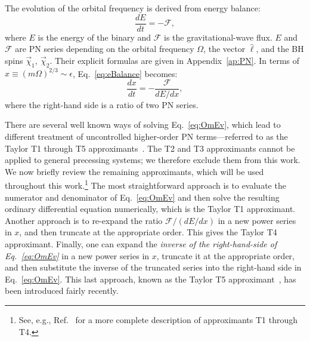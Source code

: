 \documentclass[aps,prd,amsmath,floatfix,twocolumn,superscriptaddress,nofootinbib,showpacs]{revtex4-1}
\newcommand{\ellHat}{\ensuremath{\hat{\ell}}}
\begin{document}
The evolution of the orbital frequency is derived from energy balance:
\begin{equation}
  \label{eq:eBalance}
  \frac{dE}{dt} = -\mathcal{F},
\end{equation}
where $E$ is the energy of the binary and $\mathcal{F}$ is the
gravitational-wave flux. $E$ and $\mathcal{F}$ are PN series depending
on the orbital frequency $\Omega$, the vector $\ellHat$, and the BH
spins $\vec{\chi}_{1},\ \vec{\chi}_{2}$. Their explicit formulas are
given in Appendix~\ref{ap:PN}. In terms of
  $x\equiv(m\Omega)^{2/3} \sim \epsilon$, Eq.~\eqref{eq:eBalance}
becomes:
\begin{equation}
  \label{eq:OmEv}
  \frac{dx}{dt} = -\frac{\mathcal{F}}{dE/dx},
\end{equation}
where the right-hand side is a ratio of two PN series.%

There are several well known ways of solving Eq.~\eqref{eq:OmEv},
which lead to different treatment of uncontrolled higher-order PN
terms---referred to as the Taylor T1 through T5
approximants~\cite{Damour:2000zb,Ajith:2011ec}.  The T2 and T3
approximants cannot be applied to general precessing systems; we
therefore exclude them from this work.  We now briefly review the
remaining approximants, which will be used throughout this
work.\footnote{See, e.g., Ref.~\cite{Boyle2007} for a more complete
  description of approximants T1 through T4.}  The most
straightforward approach is to evaluate the numerator and denominator
of Eq.~\eqref{eq:OmEv} and then solve the resulting ordinary
differential equation numerically, which is the Taylor T1
approximant. Another approach is to re-expand the ratio
$\mathcal{F}/(dE/dx)$ in a new power series in $x$, and then truncate at the
appropriate order. This gives the Taylor T4 approximant. Finally, one
can expand the \emph{inverse of the right-hand-side of
  Eq.~\eqref{eq:OmEv}} in a new power series in $x$, truncate it at the
appropriate order, and then substitute the inverse of the truncated
series into the right-hand side in Eq.~\eqref{eq:OmEv}.  This last
approach, known as the Taylor T5 approximant~\cite{Ajith:2011ec}, has
been introduced fairly recently.
\end{document}
